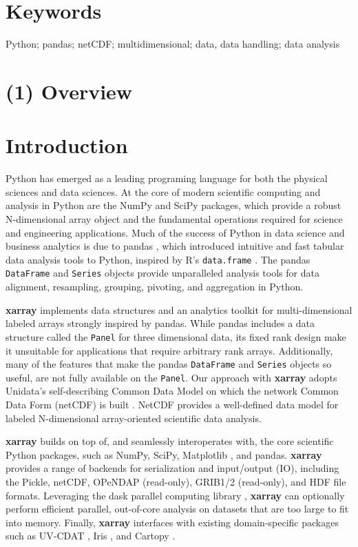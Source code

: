 \documentclass{jors}
\begin{document}
\section*{Keywords}

{Python; pandas; netCDF; multidimensional; data, data handling; data analysis}

\section*{(1) Overview}

\section*{Introduction}

Python has emerged as a leading programing language for both the physical sciences and data sciences.
At the core of modern scientific computing and analysis in Python are the NumPy \citep{Jones_2001} and SciPy \citep{van_der_Walt_2011} packages, which provide a robust N-dimensional array object and the fundamental operations required for science and engineering applications.
Much of the success of Python in data science and business analytics is due to pandas \citep{mckinney_2010}, which introduced intuitive and fast tabular data analysis tools to Python, inspired by R's \verb|data.frame| \citep{r_2013}.
The pandas \verb|DataFrame| and \verb|Series| objects provide unparalleled analysis tools for data alignment, resampling, grouping, pivoting, and aggregation in Python.

\textbf{xarray} implements data structures and an analytics toolkit for multi-dimensional labeled arrays strongly inspired by pandas.
While pandas includes a data structure called the \verb|Panel| for three dimensional data, its fixed rank design make it unsuitable for applications that require arbitrary rank arrays.
Additionally, many of the features that make the pandas \verb|DataFrame| and \verb|Series| objects so useful, are not fully available on the \verb|Panel|.
Our approach with \textbf{xarray} adopts Unidata’s self-describing Common Data Model on which the network Common Data Form (netCDF) is built \citep{Rew_1990,Brown_1993}.
NetCDF provides a well-defined data model for labeled N-dimensional array-oriented scientific data analysis.

\textbf{xarray} builds on top of, and seamlessly interoperates with, the core scientific Python packages, such as NumPy, SciPy, Matplotlib \citep{Hunter_2007}, and pandas.
\textbf{xarray} provides a range of backends for serialization and input/output (IO), including the Pickle, netCDF, OPeNDAP (read-only), GRIB1/2 (read-only), and HDF file formats.
Leveraging the dask parallel computing library \cite{dask}, \textbf{xarray} can optionally perform efficient parallel, out-of-core analysis on datasets that are too large to fit into memory.
Finally, \textbf{xarray} interfaces with existing domain-specific packages such as UV-CDAT \citep{uvcdat}, Iris \citep{Iris}, and Cartopy \citep{Cartopy}.
\end{document}
